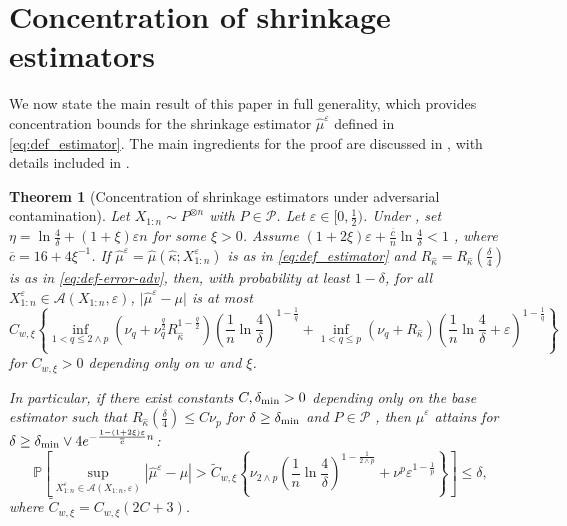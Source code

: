 \documentclass{article}
\theoremstyle{plain}
\newtheorem{theorem}{Theorem}[section]
\theoremstyle{definition}
\def\eps{\varepsilon}
\renewcommand{\Pr}{\mathbb{P}}
\def\sA{\mathcal{A}}
\def\sP{\mathcal{P}}\def\sQ{\mathcal{Q}}\def\sR{\mathcal{R}}
\begin{document}
\section{Concentration of shrinkage estimators}\label{sec:main_result}
We now state the main result of this paper in full generality, which provides concentration bounds for the shrinkage estimator $\widehat{\mu}^\varepsilon $ defined in \eqref{eq:def_estimator}. The main ingredients for the proof are discussed in , with details included in .
\begin{theorem}[Concentration of shrinkage estimators under adversarial contamination]\label{thm:shrinkage_concentration_adv}
  Let $X_{1:n}\sim P^{\otimes n}$ with $P\in\sP$. Let \( \eps \in [0,\frac{1}{2}) \). Under , set $\eta = \ln\frac{4}{\delta}+(1+\xi )\eps n $ for some \( \xi>0 \). Assume \( (1+2\xi)\eps + \frac{\overline{c}}{n}\ln \frac{4}{\delta } < 1 \) , where \( \overline{c}=16+4\xi^{-1} \). If $\widehat{\mu}^\eps  =  \widehat{\mu}(\widehat{\kappa };X_{1:n}^\eps) $ is as in \eqref{eq:def_estimator} and $R_{\widehat{\kappa}}=R_{\widehat{\kappa } }\left(\frac{\delta}{4}\right)$ is as in \eqref{eq:def-error-adv}, then, with probability at least $1-\delta$, for all \( X_{1:n}^\varepsilon \in \sA(X_{1:n},\varepsilon ) \), \( \lvert \widehat{\mu }^\varepsilon -\mu   \rvert  \) is at most  
	\begin{equation}\label{eq:conclusion_concentration}
    C_{w,\xi }\left\{\inf_{1<q\le 2\wedge p} \left(\nu _q + \nu _q^{\frac{q}{2}}R_{\widehat{\kappa } } ^{1-\frac{q}{2}}\right)\left(\frac{1}{n }\ln \frac{4}{\delta }\right)^{1-\frac{1}{q}}+\inf_{1<q\le p} \left(\nu _q +R_{\widehat{\kappa } }  \right)\left(\frac{1}{n }\ln \frac{4}{\delta } + \varepsilon \right)^{1-\frac{1}{q}}\right\}
	\end{equation}
  for $C_{w,\xi }>0$ depending only on $w$ and \( \xi  \).

  In particular, if there exist constants \( C , \delta_\textup{min}>0 \) depending only on the base estimator such that \( R_{\widehat{\kappa}}(\frac{\delta}{4})  \le C \nu _p \) for \( \delta \ge \delta_\textup{min} \) and \( P\in\sP \) , then \( \widehat{\mu}^\varepsilon   \) attains for \( \delta \ge \delta_{\textup{min}}\vee 4e^{-\frac{1-(1+2\xi)\varepsilon}{\overline{c}}n} \): \begin{equation}\label{eq:conclusion_concentration2}
    \Pr\left[ \sup_{X_{1:n}^\varepsilon \in \sA(X_{1:n},\varepsilon )}|\widehat{\mu}^\varepsilon  -\mu |  > \tilde{C}_{w,\xi}\left\{ \nu_{2\wedge p} \left(\frac{1}{n}\ln\frac{4}{\delta}\right)^{1-\frac{1}{2\wedge p}} + \nu^p \varepsilon^{1-\frac{1}{p}}\right\} \right] \leq \delta,
  \end{equation} 
  where \( \tilde{C}_{w,\xi}=C_{w,\xi}(2C+3) \).

\end{theorem}
\end{document}
